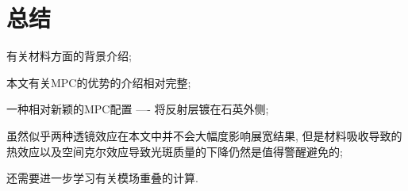 \documentclass[14pt,a4paper,oneside]{article}
\numberwithin{equation}{subsection}             %
\numberwithin{figure}{subsection}               %
\begin{document}
\section{总结}

有关材料方面的背景介绍;

本文有关MPC的优势的介绍相对完整;

一种相对新颖的MPC配置 ---- 将反射层镀在石英外侧;

虽然似乎两种透镜效应在本文中并不会大幅度影响展宽结果, 但是材料吸收导致的热效应以及空间克尔效应导致光斑质量的下降仍然是值得警醒避免的;

还需要进一步学习有关模场重叠的计算.


\newpage

\clearpage           %
{}      %
{}   %


\end{document}
